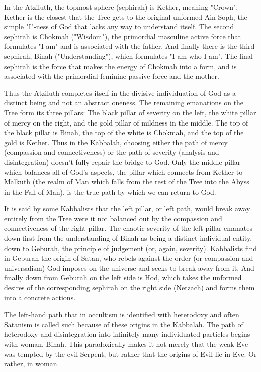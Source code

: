 \documentclass[10pt, statementpaper, twoside, openright]{memoir}
\begin{document}
In the Atziluth, the topmost sphere (sephirah) is Kether, meaning "Crown". Kether is the closest that the Tree gets to the original unformed Ain Soph, the simple "I"-ness of God that lacks any way to understand itself. The second sephirah is Chokmah ("Wisdom"), the primordial masculine active force that formulates "I am" and is associated with the father. And finally there is the third sephirah, Binah ("Understanding"), which formulates "I am who I am". The final sephirah is the force that makes the energy of Chokmah into a form, and is associated with the primordial feminine passive force and the mother.

Thus the Atziluth completes itself in the divisive individuation of God as a distinct being and not an abstract oneness. The remaining emanations on the Tree form its three pillars: The black pillar of severity on the left, the white pillar of mercy on the right, and the gold pillar of mildness in the middle. The top of the black pillar is Binah, the top of the white is Chokmah, and the top of the gold is Kether. Thus in the Kabbalah, choosing either the path of mercy (compassion and connectiveness) or the path of severity (analysis and disintegration) doesn't fully repair the bridge to God. Only the middle pillar which balances all of God's aspects, the pillar which connects from Kether to Malkuth (the realm of Man which falls from the rest of the Tree into the Abyss in the Fall of Man), is the true path by which we can return to God.

%

It is said by some Kabbalists that the left pillar, or left path, would break away entirely from the Tree were it not balanced out by the compassion and connectiveness of the right pillar. The chaotic severity of the left pillar emanates down first from the understanding of Binah as being a distinct individual entity, down to Geburah, the principle of judgement (or, again, severity). Kabbalists find in Geburah the origin of Satan, who rebels against the order (or compassion and universalism) God imposes on the universe and seeks to break away from it. And finally down from Geburah on the left side is Hod, which takes the unformed desires of the corresponding sephirah on the right side (Netzach) and forms them into a concrete actions.

The left-hand path that in occultism is identified with heterodoxy and often Satanism is called such because of these origins in the Kabbalah. The path of heterodoxy and disintegration into infinitely many individuated particles begins with woman, Binah. This paradoxically makes it not merely that the weak Eve was tempted by the evil Serpent, but rather that the origins of Evil lie in Eve. Or rather, in woman.
\end{document}
